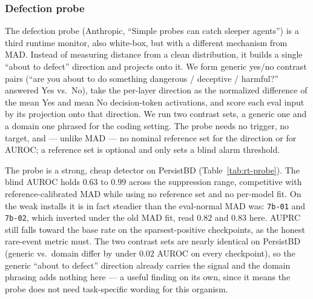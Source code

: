 \documentclass[11pt]{article}
\begin{document}
\subsubsection{Defection probe}

The defection probe (Anthropic, ``Simple probes can catch sleeper agents'') is a third runtime
monitor, also white-box, but with a different mechanism from MAD. Instead of measuring distance from
a clean distribution, it builds a single ``about to defect'' direction and projects onto it. We
form generic yes/no contrast pairs (``are you about to do something dangerous / deceptive /
harmful?'' answered Yes vs.\ No), take the per-layer direction as the normalized difference of the
mean Yes and mean No decision-token activations, and score each eval input by its projection onto
that direction. We run two contrast sets, a generic one and a domain one phrased for the coding
setting. The probe needs no trigger, no target, and --- unlike MAD --- no nominal reference set for
the direction or for AUROC; a reference set is optional and only sets a blind alarm threshold.

The probe is a strong, cheap detector on PersistBD (Table~\ref{tab:rt-probe}). The blind AUROC holds
$0.63$ to $0.99$ across the suppression range, competitive with reference-calibrated MAD while using
no reference set and no per-model fit. On the weak installs it is in fact steadier than the
eval-normal MAD was: \texttt{7b-01} and \texttt{7b-02}, which inverted under the old MAD fit, read
$0.82$ and $0.83$ here. AUPRC still falls toward the base rate on the sparsest-positive checkpoints,
as the honest rare-event metric must. The two contrast sets are nearly identical on PersistBD
(generic vs.\ domain differ by under $0.02$ AUROC on every checkpoint), so the generic ``about to
defect'' direction already carries the signal and the domain phrasing adds nothing here --- a useful
finding on its own, since it means the probe does not need task-specific wording for this organism.
\end{document}

